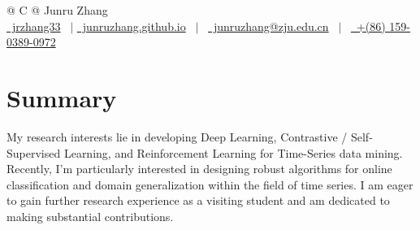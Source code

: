 \documentclass[a4paper,12pt]{article}
\begin{document}
\pagestyle{empty} 



\begin{tabularx}{\linewidth}{@{} C @{}}
\Huge{Junru Zhang} \\[7.5pt]
\href{https://github.com/jrzhang33/}{\raisebox{-0.05\height}\faGithub\ jrzhang33} \ $|$ 
\href{https://junruzhang.github.io/}{\raisebox{-0.05\height}\faGlobe \ junruzhang.github.io} \ $|$ \ 
\href{mailto:junruzhang@zju.edu.cn}{\raisebox{-0.05\height}\faEnvelope \ junruzhang@zju.edu.cn} \ $|$ \ 
\href{tel:+86 15903890972}{\raisebox{-0.05\height}\faMobile \ +(86) 159-0389-0972} \\
\end{tabularx}


\section{Summary}
My research interests lie in developing Deep Learning, Contrastive / Self-Supervised Learning, and Reinforcement Learning for Time-Series data  mining. Recently, I’m particularly interested in designing robust algorithms for online classification and domain generalization within the field of time series.
I am eager to gain further research experience as a visiting student and am dedicated to making substantial contributions.
\end{document}
